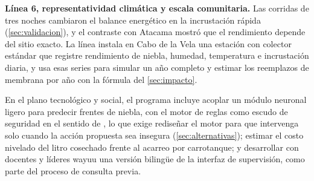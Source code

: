 \textbf{L\'inea 6, representatividad clim\'atica y escala comunitaria.} Las corridas de tres noches cambiaron el balance energ\'etico en la incrustaci\'on r\'apida (\cref{sec:validacion}), y el contraste con Atacama mostr\'o que el rendimiento depende del sitio exacto. La l\'inea instala en Cabo de la Vela una estaci\'on con colector est\'andar que registre rendimiento de niebla, humedad, temperatura e incrustaci\'on diaria, y usa esas series para simular un a\~no completo y estimar los reemplazos de membrana por a\~no con la f\'ormula del \cref{sec:impacto}.

En el plano tecnol\'ogico y social, el programa incluye acoplar un m\'odulo neuronal ligero para predecir frentes de niebla, con el motor de reglas como escudo de seguridad en el sentido de \textcite{alshiekh2018shielding}, lo que exige redise\~nar el motor para que intervenga solo cuando la acci\'on propuesta sea insegura (\cref{sec:alternativas}); estimar el costo nivelado del litro cosechado frente al acarreo por carrotanque; y desarrollar con docentes y l\'ideres wayuu una versi\'on biling\"ue de la interfaz de supervisi\'on, como parte del proceso de consulta previa.

